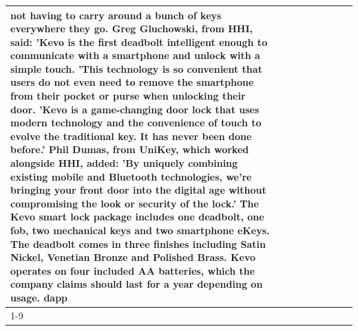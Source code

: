 \begin{table}[H]
\begin{tabular}{lllrlllll}
not having to carry around a bunch of keys everywhere they go. Greg Gluchowski, from HHI, said: 'Kevo is the first deadbolt intelligent enough to communicate with a smartphone and unlock with a simple touch. 'This technology is so convenient that users do not even need to remove the smartphone from their pocket or purse when unlocking their door. 'Kevo is a game-changing door lock that uses modern technology and the convenience of touch to evolve the traditional key. It has never been done before.' Phil Dumas, from UniKey, which worked alongside HHI, added: 'By uniquely combining existing mobile and Bluetooth technologies, we’re bringing your front door into the digital age without compromising the look or security of the lock.' The Kevo smart lock package includes one deadbolt, one fob, two mechanical keys and two smartphone eKeys. The deadbolt comes in three finishes including Satin Nickel, Venetian Bronze and Polished Brass. Kevo operates on four included AA batteries, which the company claims should last for a year depending on usage. dapp \\
\cline{1-9}

\end{tabular}
\end{table}
